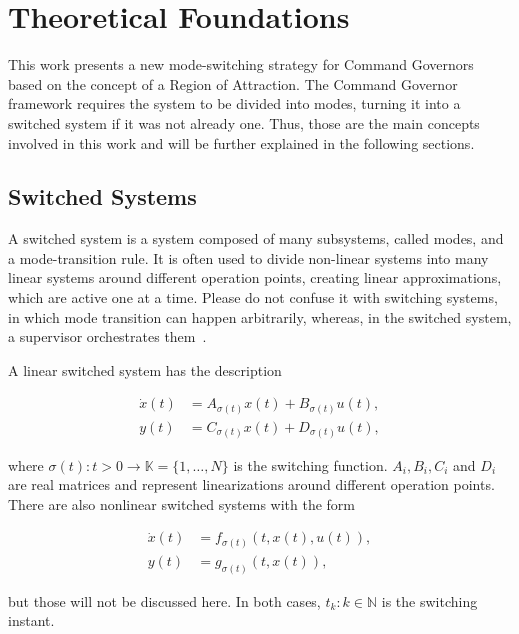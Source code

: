 
\chapter{Theoretical Foundations}%
\label{chp:theoretical-foundations}

This work presents a new mode-switching strategy for Command Governors based on
the concept of a Region of Attraction. The Command Governor framework requires
the system to be divided into modes, turning it into a switched system if it was
not already one. Thus, those are the main concepts involved in this work and
will be further explained in the following sections.

\section{Switched Systems}%
\label{sec:switched-systems}

A switched system is a system composed of many subsystems, called modes, and a
mode-transition rule. It is often used to divide non-linear systems into many
linear systems around different operation points, creating linear
approximations, which are active one at a time. Please do not confuse it with
switching systems, in which mode transition can happen arbitrarily, whereas, in
the switched system, a supervisor orchestrates
them~\parencite{lucia.franzè:stabilization,liberzon.morse:basic}.

A linear switched system has the description

\begin{align}
  \dot{x}(t) & = A_{\sigma(t)}x(t) + B_{\sigma(t)}u(t), \\
  y(t)       & = C_{\sigma(t)}x(t) + D_{\sigma(t)}u(t),
\end{align}

where \(\sigma(t):t>0\rightarrow\mathbb{K}=\{1,\ldots,N\}\) is the switching function.
\(A_{i}, B_{i}, C_{i}\) and \(D_{i}\) are real matrices and represent
linearizations around different operation points. There are also nonlinear
switched systems with the form

\begin{align}
  \dot{x}(t) & = f_{\sigma(t)}(t,x(t),u(t)), \\
  y(t)       & = g_{\sigma(t)}(t,x(t)),
\end{align}

but those will not be discussed here. In both cases, \(t_{k}:k\in\mathbb{N}\) is
the switching instant.

